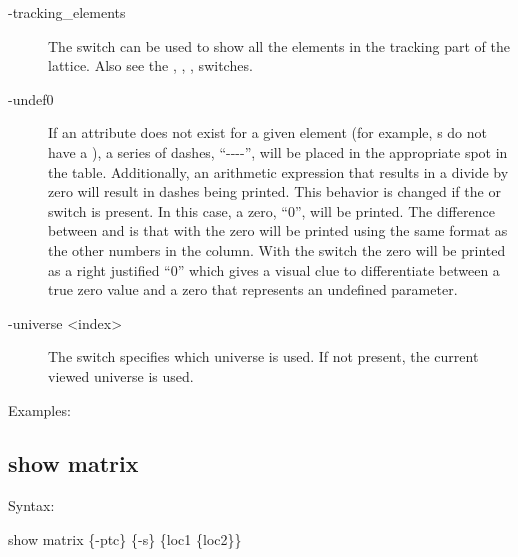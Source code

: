 {{{{{{{{\begin{description}
%
\item[-tracking_elements] \Newline
The  switch can be used to show all the elements in the tracking part of the
lattice. Also see the , , ,  switches.
%
\item[-undef0] \Newline
If an attribute does not exist for a given element (for example, s do not have a
), a series of dashes, ``-{}-{}-{}-'', will be placed in the appropriate spot in the
table.  Additionally, an arithmetic expression that results in a divide by zero will result in
dashes being printed. This behavior is changed if the  or  switch is
present. In this case, a zero, ``0'', will be printed. The difference between  and
 is that with  the zero will be printed using the same format as the other
numbers in the column. With the  switch the zero will be printed as a right justified
``0'' which gives a visual clue to differentiate between a true zero value and a zero that
represents an undefined parameter.
%
\item[-universe <index>] \Newline
The  switch specifies which universe is used. If not present, the current viewed universe is
used.
\end{description}

Examples:


\subsection{show matrix}
\label{s:show.matrix}

Syntax:
\begin{example}
  show matrix \{-ptc\} \{-s\} \{loc1 \{loc2\}\}
\end{example}


}}}}}}}}
